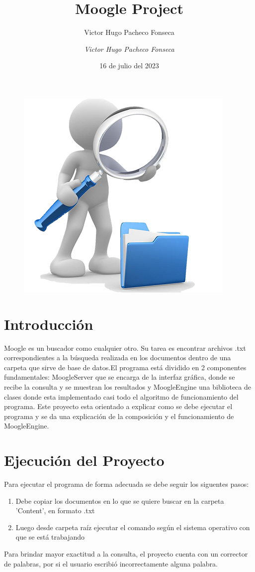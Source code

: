 \documentclass[12pt]{article}
\author{Victor Hugo Pacheco Fonseca}
\begin{document}
	\title{\Huge{\textbf{Moogle Project}}}
	\author{\textit{Victor Hugo Pacheco Fonseca}}
	\date{16 de julio del 2023}
	
	\begin{figure}
		\centering
		\includegraphics[scale=0.4]{imagen}
	\end{figure}
	\maketitle
	\newpage
	
	\section{\Huge {Introducción}}	
	
	Moogle es un buscador como cualquier otro. Su tarea es encontrar archivos .txt correspondientes a la búsqueda realizada en los documentos  dentro de una carpeta que sirve de base de datos.El programa está dividido en 2 componentes fundamentales: MoogleServer que se encarga de la interfaz gráfica, donde se recibe la consulta y se muestran los resultados y MoogleEngine una biblioteca de clases donde esta implementado casi todo el algoritmo de funcionamiento del programa. Este proyecto esta orientado a explicar como se debe ejecutar el programa y se da una explicación de la composición y el funcionamiento de MoogleEngine.   
	
	
	\newpage
	\section{\Huge {Ejecución del Proyecto}}
	Para ejecutar el programa de forma adecuada se debe seguir los siguentes pasos: 
	\begin{enumerate}
		\item Debe copiar los documentos en lo que se quiere buscar en la carpeta 'Content', en formato .txt
		\item Luego desde carpeta raíz ejecutar el comando según el sistema operativo con que se está
		trabajando
		
	\end{enumerate}
	Para brindar mayor exactitud a la consulta, el proyecto cuenta con un corrector de palabras, por
	si el usuario escribió incorrectamente alguna palabra.
\end{document}
